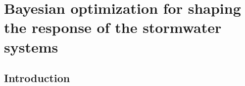 \chapter{Bayesian optimization for shaping the response of the stormwater systems}\label{ch:bayes}
\vspace{1cm}

\section{Introduction}

